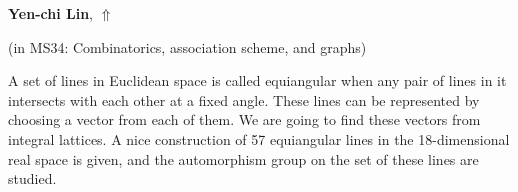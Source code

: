 \documentclass[ILAS2025-program.tex]{subfiles}
\begin{document}
\hypertarget{down0324}{}\begin{ilasabstract}
    
\textbf{Yen-chi Lin},  \hfill \hyperlink{up0324}{$\Uparrow$}
    
    
(in {\color{mstitle}MS34: Combinatorics, association scheme, and graphs})
        
\mtskip
    A set of lines in Euclidean space is called equiangular when any pair of lines in it intersects with each other at a fixed angle.
These lines can be represented by choosing a vector from each of them.
We are going to find these vectors from integral lattices.
A nice construction of 57 equiangular lines in the 18-dimensional real space is given, and the automorphism group on the set of these lines are studied.

\end{ilasabstract}
    
\end{document}
